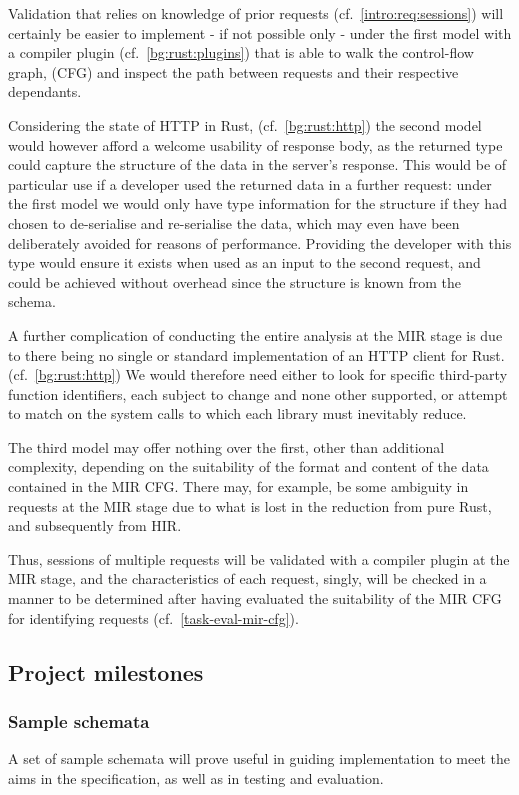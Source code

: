 Validation that relies on knowledge of prior requests (cf.~\ref{intro:req:sessions}) will certainly be easier to implement - if not possible only - under the first model with a compiler plugin (cf.~\ref{bg:rust:plugins}) that is able to walk the control-flow graph, (CFG) and inspect the path between requests and their respective dependants.

Considering the state of HTTP in Rust, (cf.~\ref{bg:rust:http}) the second model would however afford a welcome usability of response body, as the returned type could capture the structure of the data in the server's response. This would be of particular use if a developer used the returned data in a further request: under the first model we would only have type information for the structure if they had chosen to de-serialise and re-serialise the data, which may even have been deliberately avoided  for reasons of performance. Providing the developer with this type would ensure it exists when used as an input to the second request, and could be achieved without overhead since the structure is known from the schema.

A further complication of conducting the entire analysis at the MIR stage is due to there being no single or standard implementation of an HTTP client for Rust. (cf.~\ref{bg:rust:http}) We would therefore need either to look for specific third-party function identifiers, each subject to change and none other supported, or attempt to match on the system calls to which each library must inevitably reduce.

The third model may offer nothing over the first, other than additional complexity, depending on the suitability of the format and content of the data contained in the MIR CFG. There may, for example, be some ambiguity in requests at the MIR stage due to what is lost in the reduction from pure Rust, and subsequently from HIR.

Thus, sessions of multiple requests will be validated with a compiler plugin at the MIR stage, and the characteristics of each request, singly, will be checked in a manner to be determined after having evaluated the suitability of the MIR CFG for identifying requests (cf.~\ref{task-eval-mir-cfg}).\label{impl:proposal:validation}

\subsection{Project milestones}\label{tasks}

\subsubsection{Sample schemata}\label{task-sample-schemata}
A set of sample schemata will prove useful in guiding implementation to meet the aims in the specification, as well as in testing and evaluation.

